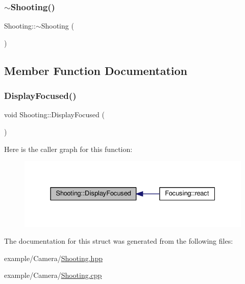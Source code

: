 \mbox{\label{struct_shooting_a99646488f60885e27785859da07f8c12}} 
\subsubsection{\texorpdfstring{$\sim$\+Shooting()}{~Shooting()}}
{\footnotesize\ttfamily Shooting\+::$\sim$\+Shooting (\begin{DoxyParamCaption}{ }\end{DoxyParamCaption})}



\subsection{Member Function Documentation}
\mbox{\label{struct_shooting_aafe6cd0faff081f08f80d4528da4af6e}} 
\subsubsection{\texorpdfstring{Display\+Focused()}{DisplayFocused()}}
{\footnotesize\ttfamily void Shooting\+::\+Display\+Focused (\begin{DoxyParamCaption}\item[{const \mbox{\hyperlink{struct_ev_in_focus}{Ev\+In\+Focus}} \&}]{ }\end{DoxyParamCaption})\hspace{0.3cm}{\ttfamily [inline]}}

Here is the caller graph for this function\+:
\nopagebreak
\begin{figure}[H]
\begin{center}
\leavevmode
\includegraphics[width=331pt]{struct_shooting_aafe6cd0faff081f08f80d4528da4af6e_icgraph}
\end{center}
\end{figure}


The documentation for this struct was generated from the following files\+:\begin{DoxyCompactItemize}
\item 
example/\+Camera/\mbox{\hyperlink{_shooting_8hpp}{Shooting.\+hpp}}\item 
example/\+Camera/\mbox{\hyperlink{_shooting_8cpp}{Shooting.\+cpp}}\end{DoxyCompactItemize}
